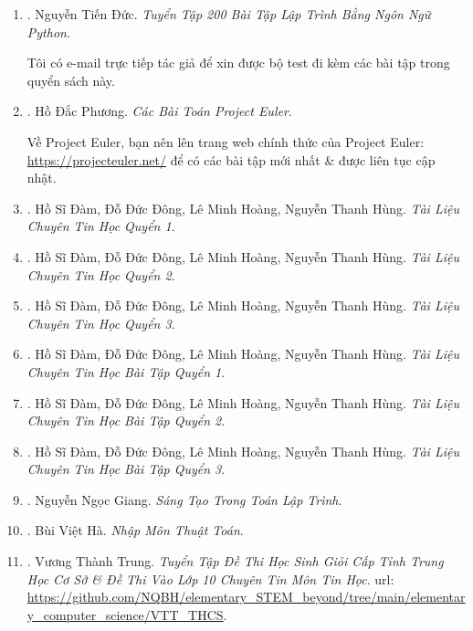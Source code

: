 \documentclass[12pt,oneside]{book}
\begin{document}
\begin{enumerate}
	\item \cite{Duc_200_BT_Python}. {\sc Nguyễn Tiến Đức}. {\it Tuyển Tập 200 Bài Tập Lập Trình Bằng Ngôn Ngữ Python}.
	
	Tôi có e-mail trực tiếp tác giả để xin được bộ test đi kèm các bài tập trong quyển sách này.
	
	\item \cite{Phuong_project_Euler}. {\sc Hồ Đắc Phương}. {\it Các Bài Toán Project Euler}.
	
	Về Project Euler, bạn nên lên trang web chính thức của Project Euler: \url{https://projecteuler.net/} để có các bài tập mới nhất \& được liên tục cập nhật.
	
	\item \cite{TL_chuyen_Tin_quyen_1}. {\sc Hồ Sĩ Đàm, Đỗ Đức Đông, Lê Minh Hoàng, Nguyễn Thanh Hùng}. {\it Tài Liệu Chuyên Tin Học Quyển 1}.
	
	\item \cite{TL_chuyen_Tin_quyen_2}. {\sc Hồ Sĩ Đàm, Đỗ Đức Đông, Lê Minh Hoàng, Nguyễn Thanh Hùng}. {\it Tài Liệu Chuyên Tin Học Quyển 2}.
	
	\item \cite{TL_chuyen_Tin_quyen_3}. {\sc Hồ Sĩ Đàm, Đỗ Đức Đông, Lê Minh Hoàng, Nguyễn Thanh Hùng}. {\it Tài Liệu Chuyên Tin Học Quyển 3}.
	
	\item \cite{TL_chuyen_Tin_BT_quyen_1}. {\sc Hồ Sĩ Đàm, Đỗ Đức Đông, Lê Minh Hoàng, Nguyễn Thanh Hùng}. {\it Tài Liệu Chuyên Tin Học Bài Tập Quyển 1}.
	
	\item \cite{TL_chuyen_Tin_BT_quyen_2}. {\sc Hồ Sĩ Đàm, Đỗ Đức Đông, Lê Minh Hoàng, Nguyễn Thanh Hùng}. {\it Tài Liệu Chuyên Tin Học Bài Tập Quyển 2}.
	
	\item \cite{TL_chuyen_Tin_BT_quyen_3}. {\sc Hồ Sĩ Đàm, Đỗ Đức Đông, Lê Minh Hoàng, Nguyễn Thanh Hùng}. {\it Tài Liệu Chuyên Tin Học Bài Tập Quyển 3}.
	
	\item \cite{Giang_sang_tao_lap_trinh}. {\sc Nguyễn Ngọc Giang}. {\it Sáng Tạo Trong Toán Lập Trình}.
	
	\item \cite{Ha_nhap_mon_thuat_toan}. {\sc Bùi Việt Hà}. {\it Nhập Môn Thuật Toán}.
	
	\item \cite{Trung_THCS_Tin}. {\sc Vương Thành Trung}. {\it Tuyển Tập Đề Thi Học Sinh Giỏi Cấp Tỉnh Trung Học Cơ Sở \& Đề Thi Vào Lớp 10 Chuyên Tin Môn Tin Học}. {\sc url}: \url{https://github.com/NQBH/elementary_STEM_beyond/tree/main/elementary_computer_science/VTT_THCS}.
	

\end{enumerate}
\end{document}
